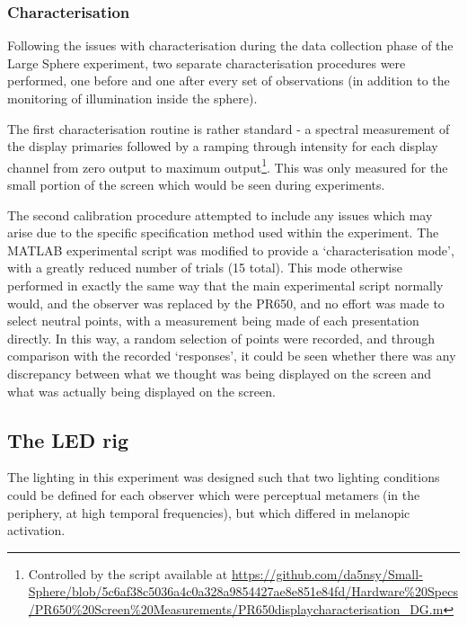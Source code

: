 

\subsubsection{Characterisation}

Following the issues with characterisation during the data collection phase of the Large Sphere experiment, two separate characterisation procedures were performed, one before and one after every set of observations (in addition to the monitoring of illumination inside the sphere).

The first characterisation routine is rather standard - a spectral measurement of the display primaries followed by a ramping through intensity for each display channel from zero output to maximum output\footnote{Controlled by the script available at \url{https://github.com/da5nsy/Small-Sphere/blob/5c6af38c5036a4c0a328a9854427ae8e851e84fd/Hardware\%20Specs/PR650\%20Screen\%20Measurements/PR650displaycharacterisation_DG.m}}. This was only measured for the small portion of the screen which would be seen during experiments.

The second calibration procedure attempted to include any issues which may arise due to the specific specification method used within the experiment. The MATLAB experimental script was modified to provide a `characterisation mode', with a greatly reduced number of trials (15 total). This mode otherwise performed in exactly the same way that the main experimental script normally would, and the observer was replaced by the \gls{PR650}, and no effort was made to select neutral points, with a measurement being made of each presentation directly. In this way, a random selection of points were recorded, and through comparison with the recorded `responses', it could be seen whether there was any discrepancy between what we thought was being displayed on the screen and what was actually being displayed on the screen.

\subsection{The LED rig}

The lighting in this experiment was designed such that two lighting conditions could be defined for each observer which were perceptual metamers (in the periphery, at high temporal frequencies), but which differed in melanopic activation.

